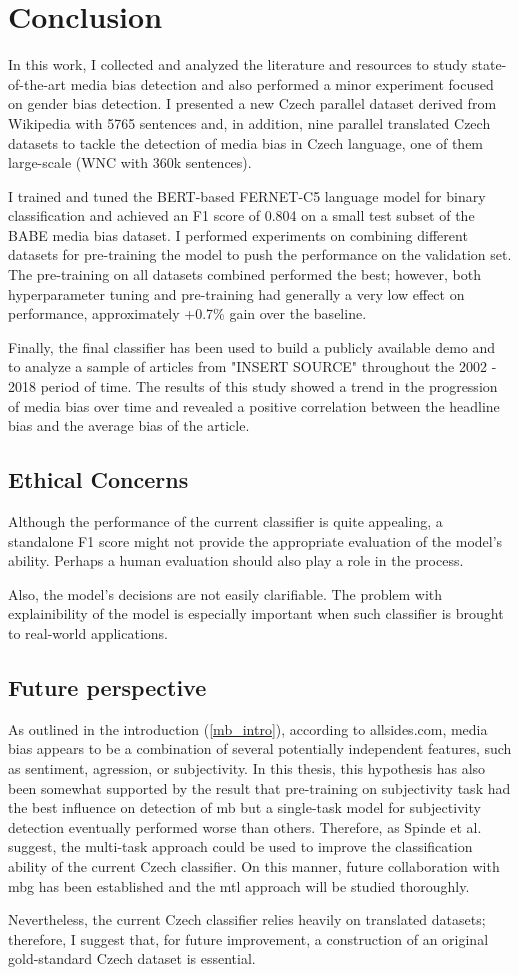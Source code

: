 \chapter{Conclusion}
In this work, I collected and analyzed the literature and resources to study state-of-the-art media bias detection and also performed a minor experiment focused on gender bias detection. I presented a new Czech parallel dataset derived from Wikipedia with 5765 sentences and, in addition, nine parallel translated Czech datasets to tackle the detection of media bias in Czech language, one of them large-scale (WNC with 360k sentences).

I trained and tuned the BERT-based FERNET-C5 language model for binary classification and achieved an F1 score of 0.804 on a small test subset of the BABE media bias dataset. I performed experiments on combining different datasets for pre-training the model to push the performance on the validation set. The pre-training on all datasets combined performed the best; however, both hyperparameter tuning and pre-training had generally a very low effect on performance, approximately +0.7\% gain over the baseline. 

Finally, the final classifier has been used to build a publicly available demo and to analyze a sample of articles from "INSERT SOURCE" throughout the 2002 - 2018 period of time. The results of this study showed a trend in the progression of media bias over time and revealed a positive correlation between the headline bias and the average bias of the article.

\section{Ethical Concerns}
Although the performance of the current classifier is quite appealing, a standalone F1 score might not provide the appropriate evaluation of the model's ability. Perhaps a human evaluation should also play a role in the process.

Also, the model's decisions are not easily clarifiable. The problem with explainibility of the model is especially important when such classifier is brought to real-world applications. 


\section{Future perspective}
As outlined in the introduction (\ref{mb_intro}), according to allsides.com, media bias appears to be a combination of several potentially independent features, such as sentiment, agression, or subjectivity. In this thesis, this hypothesis has also been somewhat supported by the result that pre-training on subjectivity task had the best influence on detection of \gls{mb} but a single-task model for subjectivity detection eventually performed worse than others. Therefore, as Spinde et al. \cite{spindeexploiting} suggest, the multi-task approach could be used to improve the classification ability of the current Czech classifier. On this manner, future collaboration with \gls{mbg} has been established and the \gls{mtl} approach will be studied thoroughly.


Nevertheless, the current Czech classifier relies heavily on translated datasets; therefore, I suggest that, for future improvement, a construction of an original gold-standard Czech dataset is essential.
